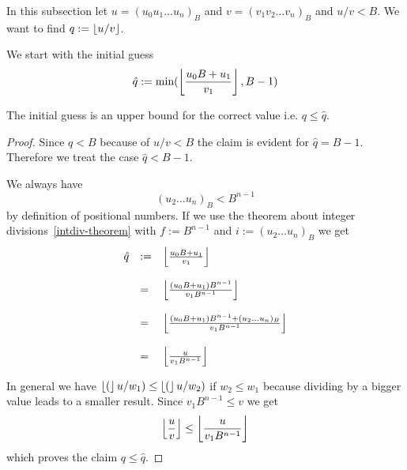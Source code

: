 In this subsection let $u = (u_0 u_1 \ldots u_n)_B$ and $v = (v_1 v_2 \ldots
v_n)_B$ and $u / v < B$.
%
We want to find $q := \left\lfloor u / v \right\rfloor$.

We start with the initial guess
$$
\hat{q} := \text{min}( \left\lfloor \frac{u_0 B + u_1}{v_1} \right\rfloor, B - 1)
$$


\begin{theorem}
    The initial guess is an upper bound for the correct value i.e. $q \le
    \hat{q}$.

    \begin{proof}
        Since $q < B$ because of $u/v < B$ the claim is evident for $\hat{q} = B
        - 1$. Therefore we treat the case $\hat{q} < B - 1$.

        We always have
        $$
            (u_2 \ldots u_n)_B < B^{n-1}
        $$
        by definition of positional numbers. If we use the theorem about integer
        divisions~\ref{intdiv-theorem} with $f := B^{n-1}$ and $i := (u_2 \ldots
        u_n)_B$ we get
        $$
        \begin{array}{lll}
            \hat{q}
            &:=&
            \left\lfloor \frac{u_0 B + u_1}{v_1} \right\rfloor
            \\
            \\
            &=&
            \left\lfloor \frac{(u_0 B + u_1) B^{n-1}}{v_1 B^{n-1}} \right\rfloor
            \\
            \\
            &=&
            \left\lfloor \frac{(u_0 B + u_1) B^{n-1} + (u_2 \ldots u_n)_B}{v_1 B^{n-1}} \right\rfloor
            \\
            \\
            &=&
            \left\lfloor \frac{u}{v_1 B^{n-1}} \right\rfloor
        \end{array}
        $$

        In general we have $\left\lfloor ( \right\rfloor u / w_1) \le \left\lfloor ( \right\rfloor u / w_2)$ if $w_2 \le
        w_1$ because dividing by a bigger value leads to a smaller result. Since
        $v_1 B^{n-1} \le v$ we get
        $$
            \left\lfloor \frac{u}{v} \right\rfloor \le \left\lfloor \frac{u}{v_1 B^{n-1}} \right\rfloor
        $$
        which proves the claim $q \le \hat{q}$.
    \end{proof}
\end{theorem}
